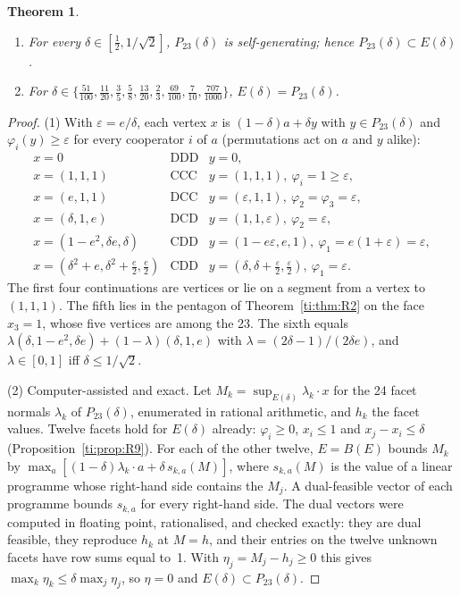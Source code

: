 \documentclass[11pt]{amsart}
\newtheorem{theorem}{Theorem}[section]
\theoremstyle{remark}
\begin{document}
\begin{theorem}\label{ti:thm:R8}
\begin{enumerate}
\item For every $\delta\in[\frac12,1/\sqrt2]$, $P_{23}(\delta)$ is self-generating; hence
  $P_{23}(\delta)\subset E(\delta)$.
\item For $\delta\in\{\frac{51}{100},\frac{11}{20},\frac35,\frac58,\frac{13}{20},\frac23,\frac{69}{100},\frac7{10},\frac{707}{1000}\}$,
  $E(\delta)=P_{23}(\delta)$.
\end{enumerate}
\end{theorem}

\begin{proof}
(1) With $\varepsilon=e/\delta$, each vertex $x$ is $(1-\delta)a+\delta y$ with $y\in P_{23}(\delta)$ and
$\varphi_i(y)\ge\varepsilon$ for every cooperator $i$ of $a$ (permutations act on $a$ and $y$ alike):
\[
\begin{array}{lll}
x=0 & \text{DDD} & y=0,\\
x=(1,1,1) & \text{CCC} & y=(1,1,1),\ \varphi_i=1\ge\varepsilon,\\
x=(e,1,1) & \text{DCC} & y=(\varepsilon,1,1),\ \varphi_2=\varphi_3=\varepsilon,\\
x=(\delta,1,e) & \text{DCD} & y=(1,1,\varepsilon),\ \varphi_2=\varepsilon,\\
x=(1-e^2,\delta e,\delta) & \text{CDD} & y=(1-e\varepsilon,e,1),\ \varphi_1=e(1+\varepsilon)=\varepsilon,\\
x=(\delta^2+e,\delta^2+\frac e2,\frac e2) & \text{CDD} & y=(\delta,\delta+\frac\varepsilon2,\frac\varepsilon2),\ \varphi_1=\varepsilon.
\end{array}
\]
The first four continuations are vertices or lie on a segment from a vertex to $(1,1,1)$. The fifth
lies in the pentagon of Theorem~\ref{ti:thm:R2} on the face $x_3=1$, whose five vertices are among
the 23. The sixth equals $\lambda(\delta,1-e^2,\delta e)+(1-\lambda)(\delta,1,e)$ with
$\lambda=(2\delta-1)/(2\delta e)$, and $\lambda\in[0,1]$ iff $\delta\le1/\sqrt2$.

(2) Computer-assisted and exact. Let $M_k=\sup_{E(\delta)}\lambda_k\cdot x$ for the 24 facet normals
$\lambda_k$ of $P_{23}(\delta)$, enumerated in rational arithmetic, and $h_k$ the facet values. Twelve
facets hold for $E(\delta)$ already: $\varphi_i\ge0$, $x_i\le1$ and $x_j-x_i\le\delta$
(Proposition~\ref{ti:prop:R9}). For each of the other twelve, $E=B(E)$ bounds $M_k$ by
$\max_a[(1-\delta)\lambda_k\cdot a+\delta\,s_{k,a}(M)]$, where $s_{k,a}(M)$ is the value of a linear
programme whose right-hand side contains the $M_j$. A dual-feasible vector of each programme bounds
$s_{k,a}$ for every right-hand side. The dual vectors were computed in floating point, rationalised,
and checked exactly: they are dual feasible, they reproduce $h_k$ at $M=h$, and their entries on the
twelve unknown facets have row sums equal to~1. With $\eta_j=M_j-h_j\ge0$ this gives
$\max_k \eta_k\le\delta\max_j \eta_j$, so $\eta=0$ and $E(\delta)\subset P_{23}(\delta)$.

\end{proof}
\end{document}
